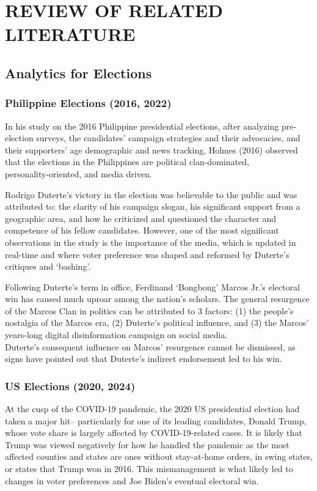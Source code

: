 \chapter{REVIEW OF RELATED LITERATURE}

\section{Analytics for Elections}
\subsection{Philippine Elections (2016, 2022)}
In his study on the 2016 Philippine presidential elections, after analyzing pre-election surveys, the candidates' campaign strategies and their advocacies, and their supporters' age demographic and news tracking, Holmes (2016) observed that the elections in the Philippines are political clan-dominated, \\personality-oriented, and media driven.\cite{RRL_Holmes-2016}

Rodrigo Duterte's victory in the election was believable to the public and was attributed to: the clarity of his campaign slogan, his significant support from a geographic area, and how he criticized and questioned the character and competence of his fellow candidates. However, one of the most significant observations in the study is the importance of the media, which is updated in real-time and where voter preference was shaped and reformed by Duterte’s critiques and ‘bashing’.\cite{RRL_Holmes-2016}

Following Duterte’s term in office, Ferdinand ‘Bongbong’ Marcos Jr.’s electoral win has caused much uproar among the nation’s scholars. The general resurgence of the Marcos Clan in politics can be attributed to 3 factors: (1) the people’s nostalgia of the Marcos era, (2) Duterte’s political influence, and (3) the Marcos’ years-long digital disinformation campaign on social media.\cite{RRL_Pernia-2025} \\Duterte’s consequent influence on Marcos’ resurgence cannot be dismissed, as signs have pointed out that Duterte’s indirect endorsement led to his win.\cite{RRL_Dulay-2023}

\subsection{US Elections (2020, 2024)}
At the cusp of the COVID-19 pandemic, the 2020 US presidential election had taken a major hit– particularly for one of its leading candidates, Donald Trump, whose vote share is largely affected by COVID-19-related cases.\cite{RRL_Baccini-2021} It is likely that Trump was viewed negatively for how he handled the pandemic as the most affected counties and states are ones without stay-at-home orders, in swing states, or states that Trump won in 2016. This mismanagement is what likely led to changes in voter preferences and Joe Biden’s eventual electoral win.

